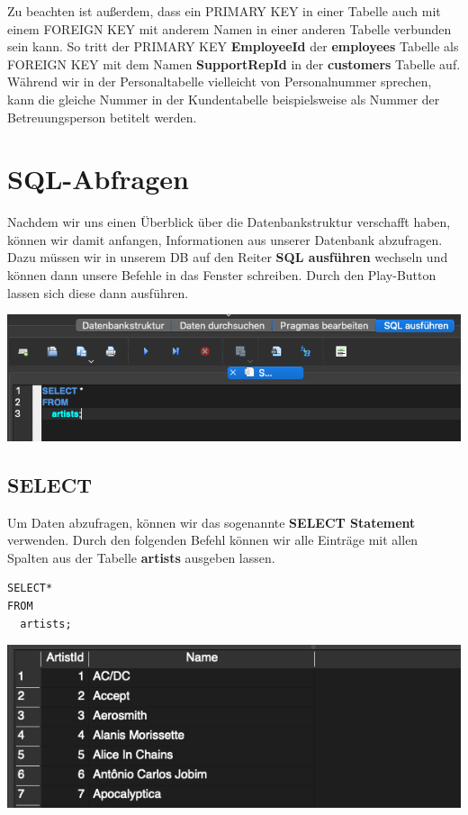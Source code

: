 \documentclass[
]{book}
\begin{document}
Zu beachten ist außerdem, dass ein PRIMARY KEY in einer Tabelle auch mit einem FOREIGN KEY mit anderem Namen in einer anderen Tabelle verbunden sein kann. So tritt der PRIMARY KEY \textbf{EmployeeId} der \textbf{employees} Tabelle als FOREIGN KEY mit dem Namen \textbf{SupportRepId} in der \textbf{customers} Tabelle auf. Während wir in der Personaltabelle vielleicht von Personalnummer sprechen, kann die gleiche Nummer in der Kundentabelle beispielsweise als Nummer der Betreuungsperson betitelt werden.

\hypertarget{sql-abfragen}{%
\chapter{SQL-Abfragen}\label{sql-abfragen}}

Nachdem wir uns einen Überblick über die Datenbankstruktur verschafft haben, können wir damit anfangen, Informationen aus unserer Datenbank abzufragen. Dazu müssen wir in unserem DB auf den Reiter \textbf{SQL ausführen} wechseln und können dann unsere Befehle in das Fenster schreiben. Durch den Play-Button lassen sich diese dann ausführen.

\includegraphics[width=10.41667in,height=\textheight]{img-SELECT1.png}

\hypertarget{select}{%
\section{SELECT}\label{select}}

Um Daten abzufragen, können wir das sogenannte \textbf{SELECT Statement} verwenden. Durch den folgenden Befehl können wir alle Einträge mit allen Spalten aus der Tabelle \textbf{artists} ausgeben lassen.

\begin{verbatim}
SELECT*
FROM
  artists;
\end{verbatim}

\includegraphics[width=10.41667in,height=\textheight]{img-SELECT2.png}
\end{document}
